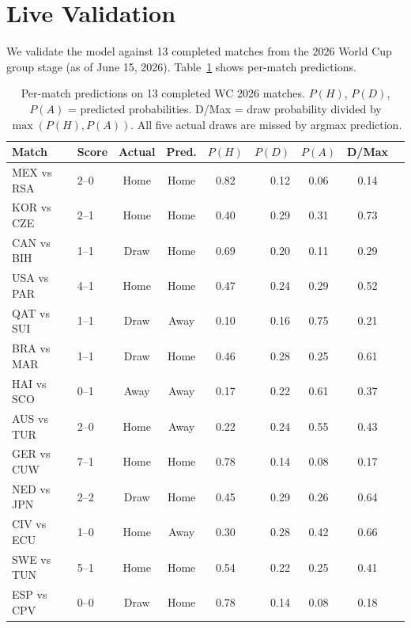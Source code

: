 \documentclass[11pt,a4paper]{article}
\begin{document}
\section{Live Validation}
\label{sec:validation}

We validate the model against 13 completed matches from the 2026 World Cup group stage (as of June 15, 2026). Table~\ref{tab:live} shows per-match predictions.

\begin{table}[t]
\centering
\caption{Per-match predictions on 13 completed WC 2026 matches. $P(H)$, $P(D)$, $P(A)$ = predicted probabilities. D/Max = draw probability divided by $\max(P(H), P(A))$. All five actual draws are missed by argmax prediction.}
\label{tab:live}
\small
\begin{tabular}{llcccrccc}
\toprule
\textbf{Match} & \textbf{Score} & \textbf{Actual} & \textbf{Pred.} & $P(H)$ & $P(D)$ & $P(A)$ & \textbf{D/Max} & \\
\midrule
MEX vs RSA & 2--0 & Home & Home & 0.82 & 0.12 & 0.06 & 0.14 & \\
KOR vs CZE & 2--1 & Home & Home & 0.40 & 0.29 & 0.31 & 0.73 & \\
CAN vs BIH & 1--1 & Draw & Home & 0.69 & 0.20 & 0.11 & 0.29 & \\
USA vs PAR & 4--1 & Home & Home & 0.47 & 0.24 & 0.29 & 0.52 & \\
QAT vs SUI & 1--1 & Draw & Away & 0.10 & 0.16 & 0.75 & 0.21 & \\
BRA vs MAR & 1--1 & Draw & Home & 0.46 & 0.28 & 0.25 & 0.61 & \\
HAI vs SCO & 0--1 & Away & Away & 0.17 & 0.22 & 0.61 & 0.37 & \\
AUS vs TUR & 2--0 & Home & Away & 0.22 & 0.24 & 0.55 & 0.43 & \\
GER vs CUW & 7--1 & Home & Home & 0.78 & 0.14 & 0.08 & 0.17 & \\
NED vs JPN & 2--2 & Draw & Home & 0.45 & 0.29 & 0.26 & 0.64 & \\
CIV vs ECU & 1--0 & Home & Away & 0.30 & 0.28 & 0.42 & 0.66 & \\
SWE vs TUN & 5--1 & Home & Home & 0.54 & 0.22 & 0.25 & 0.41 & \\
ESP vs CPV & 0--0 & Draw & Home & 0.78 & 0.14 & 0.08 & 0.18 & \\
\bottomrule
\end{tabular}
\end{table}
\end{document}
